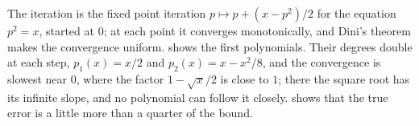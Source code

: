 The iteration is the fixed point iteration $p\mapsto p+(x-p^2)/2$ for the equation $p^2=x$, started at $0$; at each point it converges monotonically, and Dini's theorem makes the convergence uniform.  shows the first polynomials. Their degrees double at each step, $p_1(x)=x/2$ and $p_2(x)=x-x^2/8$, and the convergence is slowest near $0$, where the factor $1-\sqrt x/2$ is close to $1$; there the square root has its infinite slope, and no polynomial can follow it closely.  shows that the true error is a little more than a quarter of the bound.

\begin{figure}
\end{figure}
